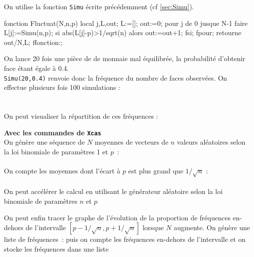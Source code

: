 \documentclass[12pt,a4paper]{book}
\begin{document}
\begin{giacjshere}
On utilise la fonction {\tt Simu} \'ecrite pr\'ec\'edemment 
(cf \ref{sec:Simu}).
\begin{giacprog}
fonction Fluctuat(N,n,p)
  local j,L,out;
  L:=[];
  out:=0;
  pour j de 0 jusque N-1 faire
    L[j]:=Simu(n,p);
    si abs(L[j]-p)>1/sqrt(n) alors out:=out+1; fsi;
  fpour;
  retourne out/N,L;
ffonction:;
\end{giacprog}
On lance 20 fois une pi\`ece de de monnaie mal \'equilibr\'ee, la 
probabilit\'e d'obtenir face \'etant \'egale \`a 0.4.\\
{\tt Simu(20,0.4)} renvoie donc la fr\'equence du nombre de faces observ\'ees.
On effectue plusieurs fois 100 simulations :
\\
\\
\\
On peut visualiser la r\'epartition de ces fr\'equences :\\

{\bf Avec les commandes de  {\tt Xcas}}\\
On g\'en\`ere une s\'equence de $N$ moyennes de vecteurs de $n$
valeurs al\'eatoires selon la loi binomiale de param\`etres 1 et $p$~:\\
\\
On compte les moyennes dont l'\'ecart \`a $p$ est plus grand que $1/\sqrt{n}$ :\\
\\
On peut acc\'el\'erer le calcul en utilisant le g\'en\'erateur
al\'eatoire selon la loi binomiale
de param\`etres $n$ et $p$
\\

On peut enfin tracer le graphe de l'\'evolution de la 
proportion de fr\'equences en-dehors
de l'intervalle $[p-1/\sqrt{n},p+1/\sqrt{n}]$ lorsque $N$ augmente.
On g\'en\`ere une liste de fr\'equences~:
puis on compte les fr\'equences en-dehors de l'intervalle et on
stocke les fr\'equences dans une liste


\end{giacjshere}
\end{document}
